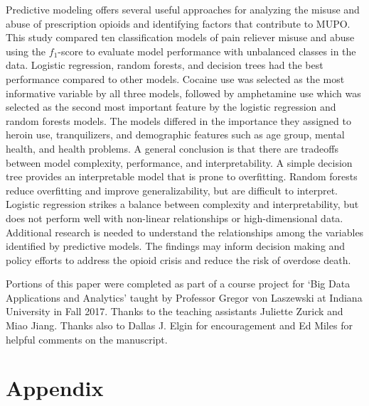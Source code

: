 \documentclass[sigconf]{acmart}
\begin{document}
Predictive modeling offers several useful approaches for analyzing the misuse
and abuse of prescription opioids and identifying factors that contribute to 
MUPO. This study compared ten classification models of pain reliever misuse 
and abuse using the $f_1$-score to evaluate model performance with unbalanced 
classes in the data. Logistic regression, random forests, and decision trees 
had the best performance compared to other models. Cocaine use was selected 
as the most informative variable by all three models, followed by amphetamine 
use which was selected as the second most important feature by the logistic
regression and random forests models. The models differed in  the importance 
they assigned to heroin use, tranquilizers, and demographic features such as 
age group, mental health, and health problems. A general conclusion is that 
there are tradeoffs between model complexity, performance, and 
interpretability. A simple decision tree provides an interpretable model 
that is prone to overfitting. Random forests reduce overfitting and improve 
generalizability, but are difficult to interpret. Logistic regression strikes 
a balance between complexity and interpretability, but does not perform well
with non-linear relationships or high-dimensional data. Additional research 
is needed to understand the relationships among the variables identified by 
predictive models. The findings may inform decision making and policy efforts 
to address the opioid crisis and reduce the risk of overdose death. 

\begin{acks}

Portions of this paper were completed as part of a course project for
`Big Data Applications and Analytics' taught by Professor Gregor von Laszewski 
at Indiana University in Fall 2017. Thanks to the teaching assistants Juliette 
Zurick and Miao Jiang. Thanks also to Dallas J. Elgin for encouragement and 
Ed Miles for helpful comments on the manuscript. 

\end{acks}

 

\appendix

\section{Appendix}
\end{document}
